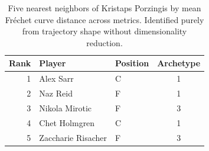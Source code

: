 \begin{table}[htbp]
  \centering\small
  \begin{tabular}{rllc}
    \toprule
    Rank & Player & Position & Archetype \\
    \midrule
    1 & Alex Sarr & C & 1 \\
    2 & Naz Reid & F & 1 \\
    3 & Nikola Mirotic & F & 3 \\
    4 & Chet Holmgren & C & 1 \\
    5 & Zaccharie Risacher & F & 3 \\
    \bottomrule
  \end{tabular}
  \caption{Five nearest neighbors of Kristaps Porzingis by mean Fr\'{e}chet curve distance across metrics. Identified purely from trajectory shape without dimensionality reduction.}
  \label{tab:Kristaps_Porzingis_frechet_curve_neighbors}
\end{table}

